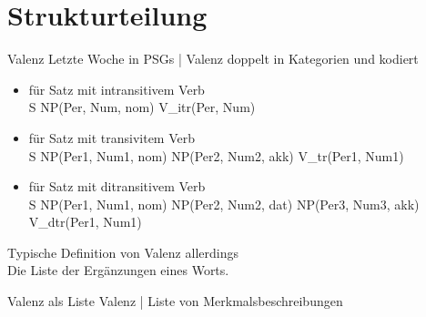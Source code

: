 \section{Strukturteilung}

\begin{frame}
  {Valenz}
  \onslide<+->
  \onslide<+->
  Letzte Woche in PSGs | Valenz doppelt in \alert{Kategorien} und  kodiert\\
  \Halbzeile
  \begin{itemize}[<+->]
    \item[ ]  für Satz mit intransitivem Verb\\
      \footnotesize S \goesto NP(Per, Num, nom) \alert{V\_itr}(Per, Num)
    \item[ ]  für Satz mit transivitem Verb\\
      \footnotesize S \goesto NP(Per1, Num1, nom) NP(Per2, Num2, akk) \alert{V\_tr}(Per1, Num1)
    \item[ ]  für Satz mit ditransitivem Verb\\
      \footnotesize S \goesto NP(Per1, Num1, nom) NP(Per2, Num2, dat) NP(Per3, Num3, akk) \alert{V\_dtr}(Per1, Num1)
  \end{itemize}
  \onslide<+->
  \Zeile
  \alert{Typische Definition von Valenz allerdings}\\
  \onslide<+->
  Die \alert{Liste} der Ergänzungen eines Worts.\\
\end{frame}

\begin{frame}
  {Valenz als Liste}
  \onslide<+->
  \onslide<+->
  Valenz | \alert{Liste von Merkmalsbeschreibungen}\\
  \onslide<+->
  \Halbzeile
\end{frame}

